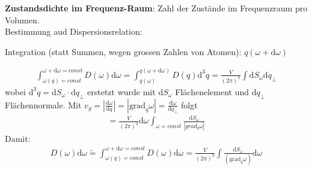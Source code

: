 \begin{itemize}
\textbf{Zustandsdichte im Frequenz-Raum}: Zahl der Zustände im Frequenzraum pro Volumen.\\
Bestimmung aud Dispersionsrelation:

Integration (statt Summen, wegen grossen Zahlen von Atomen): $q(\omega+\mathrm{d}\omega)$

\begin{align*}
	\int_{\omega(q)=const}^{\omega+\mathrm{d}\omega = const} D(\omega)\mathrm{d}\omega = \int_{q(\omega)}^{q(\omega+\mathrm{d}\omega)} D(q)\mathrm{d}^3q
	= \frac{V}{(2\pi)^3}\int\mathrm{d}S_\omega\mathrm{d}q_\bot 
\end{align*}
wobei $ \mathrm{d}^3q = \mathrm{d}S_\omega \cdot \mathrm{d}q_\bot $ erstetzt wurde mit $\mathrm{d}S_\omega$ Flächenelement und $\mathrm{d}q_\bot$ Flächennormale.
Mit $v_g = \left|\frac{\mathrm{d}\omega}{\mathrm{d}q}\right| = \left|\text{grad}_q\omega\right| = \frac{\mathrm{d}\omega}{\mathrm{d}q_\bot} $ folgt
\begin{align}
	= \frac{V}{(2\pi)^3} \mathrm{d}\omega \int_{\omega = const} \frac{\mathrm{d}S_\omega}{\left|grad_q\omega\right|}
\end{align}
Damit:
\begin{align*}
	D(\omega) \mathrm{d} \omega \tilde{=} \int_{\omega(q)=const}^{\omega+\mathrm{d}\omega = const} D(\omega)\mathrm{d}\omega = \frac{V}{(2\pi)^3} \int \frac{\mathrm{d}S_{\omega}}{(\text{grad}_{q} \omega)} \mathrm{d}\omega
\end{align*}


\end{itemize}
